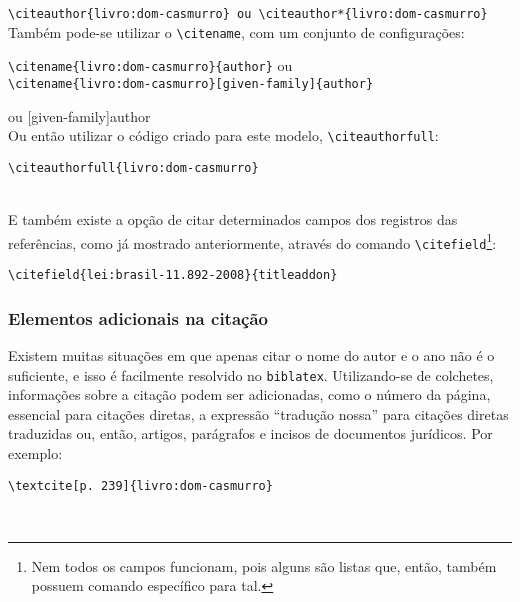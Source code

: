 \verb|\citeauthor{livro:dom-casmurro} ou \citeauthor*{livro:dom-casmurro}|\\

Também pode-se utilizar o \verb|\citename|, com um conjunto de configurações: 

\verb|\citename{livro:dom-casmurro}{author}| ou \\\verb|\citename{livro:dom-casmurro}[given-family]{author}|

 ou [given-family]{author}\\

Ou então utilizar o código criado para este modelo, \verb|\citeauthorfull|\footnotemark:

\verb|\citeauthorfull{livro:dom-casmurro}|

\\

E também existe a opção de citar determinados campos dos registros das referências, como já mostrado anteriormente, através do comando \verb|\citefield|\footnote{Nem todos os campos funcionam, pois alguns são listas que, então, também possuem comando específico para tal.}:

\verb|\citefield{lei:brasil-11.892-2008}{titleaddon}|


\subsubsection{Elementos adicionais na citação}
Existem muitas situações em que apenas citar o nome do autor e o ano não é o suficiente, e isso é facilmente resolvido no \verb|biblatex|. Utilizando-se de colchetes, informações sobre a citação podem ser adicionadas, como o número da página, essencial para citações diretas, a expressão ``tradução nossa'' para citações diretas traduzidas ou, então, artigos, parágrafos e incisos de documentos jurídicos. Por exemplo:

\verb|\textcite[p. 239]{livro:dom-casmurro}|

\textcite[p. 239]{livro:dom-casmurro}\\


